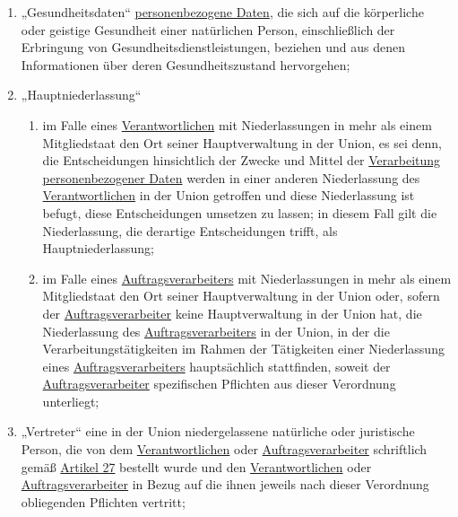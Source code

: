\begin{enumerate}
  \item „Gesundheitsdaten“ \hyperref[itm:04-1]{personenbezogene Daten}, die sich auf die körperliche oder geistige
   Gesundheit einer natürlichen Person, einschließlich der Erbringung von Gesundheitsdienstleistungen, beziehen und aus
   denen Informationen über deren Gesundheitszustand hervorgehen;
  \label{itm:04-15}

  \item „Hauptniederlassung“
  \label{itm:04-16}

  \begin{enumerate}
  
    \item im Falle eines \hyperref[itm:04-7]{Verantwortlichen} mit Niederlassungen in mehr als einem Mitgliedstaat den
     Ort seiner Hauptverwaltung in der Union, es sei denn, die Entscheidungen hinsichtlich der Zwecke und Mittel
     der \hyperref[itm:04-2]{Verarbeitung}
     \hyperref[itm:04-1]{personenbezogener Daten} werden in einer anderen Niederlassung des \hyperref[itm:04-7]
      {Verantwortlichen} in der Union getroffen und diese Niederlassung ist befugt, diese Entscheidungen umsetzen zu
      lassen; in diesem Fall gilt die Niederlassung, die derartige Entscheidungen trifft, als Hauptniederlassung;
    \label{itm:04-16a}

    \item im Falle eines \hyperref[itm:04-8]{Auftragsverarbeiters} mit Niederlassungen in mehr als einem Mitgliedstaat
     den Ort seiner Hauptverwaltung in der Union oder, sofern der \hyperref[itm:04-8]{Auftragsverarbeiter} keine
     Hauptverwaltung in der Union hat, die Niederlassung des \hyperref[itm:04-8]{Auftragsverarbeiters} in der Union, in
     der die Verarbeitungstätigkeiten im Rahmen der Tätigkeiten einer Niederlassung eines \hyperref[itm:04-8]
     {Auftragsverarbeiters} hauptsächlich stattfinden, soweit der \hyperref[itm:04-8]{Auftragsverarbeiter} spezifischen
     Pflichten aus dieser Verordnung unterliegt;
    \label{itm:04-16b}

  \end{enumerate}

  \item „Vertreter“ eine in der Union niedergelassene natürliche oder juristische Person, die von dem \hyperref
   [itm:04-7]{Verantwortlichen} oder \hyperref[itm:04-8]{Auftragsverarbeiter} schriftlich gemäß \hyperref[ch:27]
   {Artikel 27} bestellt wurde und den \hyperref[itm:04-7]{Verantwortlichen} oder
   \hyperref[itm:04-8]{Auftragsverarbeiter} in Bezug auf die ihnen jeweils nach dieser Verordnung obliegenden Pflichten
    vertritt;
  \label{itm:04-17}


\end{enumerate}
